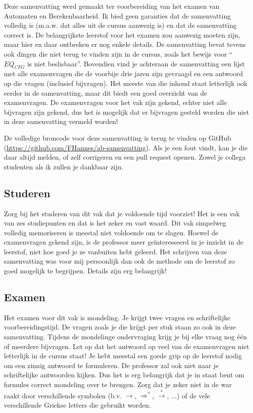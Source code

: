 \documentclass[a4paper]{article}
\begin{document}
Deze samenvatting werd gemaakt ter voorbereiding van het examen van Automaten en Berekenbaarheid. Ik bied geen garanties dat de samenvatting volledig is (m.a.w. dat alles uit de cursus aanwezig is) en dat de samenvatting correct is. De belangrijkste leerstof voor het examen zou aanwezig moeten zijn, maar hier en daar ontbreken er nog enkele details. De samenvatting bevat tevens ook dingen die niet terug te vinden zijn in de cursus, zoals het bewijs voor ``$EQ_{CFG}$ is niet beslisbaar''. Bovendien vind je achteraan de samenvatting een lijst met alle examenvragen die de voorbije drie jaren zijn gevraagd en een antwoord op die vragen (inclusief bijvragen). Het meeste van die inhoud staat letterlijk ook eerder in de samenvatting, maar dit biedt een goed overzicht van de examenvragen. De examenvragen voor het vak zijn gekend, echter niet alle bijvragen zijn gekend, dus het is mogelijk dat er bijvragen gesteld worden die niet in deze samenvatting vermeld worden!

De volledige broncode voor deze samenvatting is terug te vinden op GitHub (\url{https://github.com/FHannes/ab-samenvatting}). Als je een fout vindt, kan je die daar altijd melden, of zelf corrigeren en een pull request openen. Zowel je collega studenten als ik zullen je dankbaar zijn.

\subsection{Studeren}

Zorg bij het studeren van dit vak dat je voldoende tijd voorziet! Het is een vak van zes studiepunten en dat is het zeker en vast waard. Dit vak simpelweg volledig memoriseren is meestal niet voldoende om te slagen. Hoewel de examenvragen gekend zijn, is de professor meer ge\"interesseerd in je inzicht in de leerstof, niet hoe goed je ze vanbuiten hebt geleerd. Het schrijven van deze samenvatting was voor mij persoonlijk dan ook de methode om de leerstof zo goed mogelijk te begrijpen. Details zijn erg belangrijk!

\subsection{Examen}

Het examen voor dit vak is mondeling. Je krijgt twee vragen en schriftelijke voorbereidingstijd. De vragen zoals je die krijgt per stuk staan zo ook in deze samenvatting. Tijdens de mondelinge ondervraging krijg je bij elke vraag nog \'e\'en of meerdere bijvragen. Let op dat het antwoord op veel van de examenvragen niet letterlijk in de cursus staat! Je hebt meestal een goede grip op de leerstof nodig om een zinnig antwoord te formuleren. De professor zal ook niet naar je schriftelijke antwoorden kijken. Dus het is erg belangrijk dat je in staat bent om formules correct mondeling over te brengen. Zorg dat je zeker niet in de war raakt door verschillende symbolen (b.v. $\rightarrow$, $\Rightarrow^*$, $\stackrel{*}{\longrightarrow}$, ...) of de vele verschillende Griekse letters die gebruikt worden.
\end{document}
